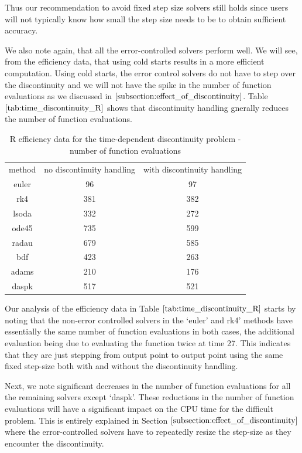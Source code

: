 Thus our recommendation to avoid fixed step size solvers still holds since users will not typically know how small the step size needs to be to obtain sufficient accuracy.

We also note again, that all the error-controlled solvers perform well. We will see, from the efficiency data, that using cold starts results in a more efficient computation. Using cold starts, the error control solvers do not have to step over the discontinuity and we will not have the spike in the number of function evaluations as we discussed in $\ref{subsection:effect_of_discontinuity}$. Table $\ref{tab:time_discontinuity_R}$ shows that discontinuity handling gnerally reduces the number of function evaluations. 

\begin{table}[H]
\caption {R efficiency data for the time-dependent discontinuity problem - number of function evaluations} 
\label{tab:time_discontinuity_R}
\begin{center}
\begin{tabular}{ c c c } 
method & no discontinuity handling & with discontinuity handling \\ 
euler & 96 & 97 \\
rk4 & 381 & 382 \\ 
lsoda & 332 & 272 \\
ode45 & 735 & 599 \\
radau & 679 & 585 \\
bdf & 423 & 263 \\
adams & 210 & 176 \\
daspk & 517 & 521
\end{tabular}
\end{center}
\end{table}

Our analysis of the efficiency data in Table $\ref{tab:time_discontinuity_R}$ starts by noting that the non-error controlled solvers in the `euler' and rk4' methods have essentially the same number of function evaluations in both cases, the additional evaluation being due to evaluating the function twice at time 27. This indicates that they are just stepping from output point to output point using the same fixed step-size both with and without the discontinuity handling.

Next, we note significant decreases in the number of function evaluations for all the remaining solvers except `daspk'. These reductions in the number of function evaluations will have a significant impact on the CPU time for the difficult problem. This is entirely explained in Section $\ref{subsection:effect_of_discontinuity}$ where the error-controlled solvers have to repeatedly resize the step-size as they encounter the discontinuity.


